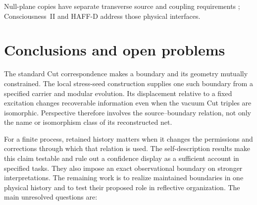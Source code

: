 \documentclass[12pt]{article}
\theoremstyle{definition}
\theoremstyle{remark}
\begin{document}
Null-plane copies have separate transverse source and coupling
requirements \cite{CTT,CF}; Consciousness~II and HAFF-D address
those physical interfaces.

\section{Conclusions and open problems}\label{sec:open}

The standard Cut correspondence makes a boundary and its geometry
mutually constrained. The local stress-seed construction supplies
one such boundary from a specified carrier and modular evolution.
Its displacement relative to a fixed excitation changes recoverable
information even when the vacuum Cut triples are isomorphic.
Perspective therefore involves the source--boundary relation, not
only the name or isomorphism class of its reconstructed net.

For a finite process, retained history matters when it changes the
permissions and corrections through which that relation is used.
The self-description results make this claim testable and rule out
a confidence display as a sufficient account in specified tasks.
They also impose an exact observational boundary on stronger
interpretations. The remaining work is to realize maintained
boundaries in one physical history and to test their proposed role
in reflective organization. The main unresolved questions are:
\end{document}
